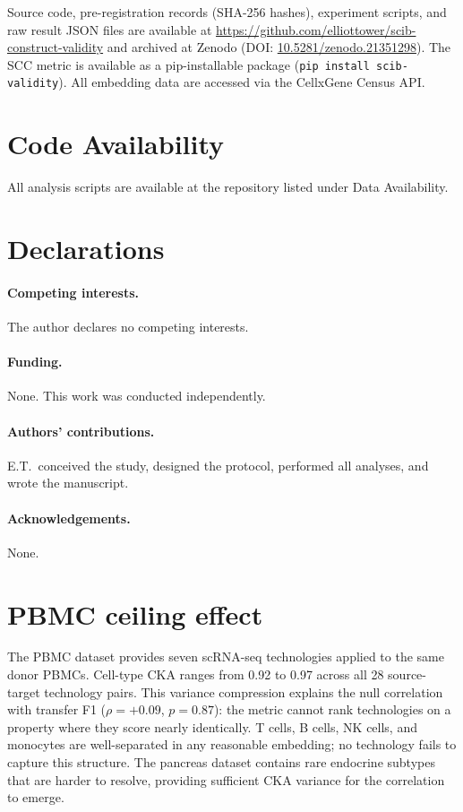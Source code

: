 \documentclass[11pt]{article}
\begin{document}
Source code, pre-registration records (SHA-256 hashes), experiment
scripts, and raw result JSON files are available at
\url{https://github.com/elliottower/scib-construct-validity} and
archived at Zenodo (DOI:
\href{https://doi.org/10.5281/zenodo.21351298}{10.5281/zenodo.21351298}).
The SCC metric is available as a pip-installable package (\texttt{pip
install scib-validity}). All embedding data are accessed via the
CellxGene Census API.

\section*{Code Availability}

All analysis scripts are available at the repository listed under Data
Availability.

\section*{Declarations}

\paragraph{Competing interests.} The author declares no competing
interests.

\paragraph{Funding.} None. This work was conducted independently.

\paragraph{Authors' contributions.} E.T.\ conceived the study,
designed the protocol, performed all analyses, and wrote the
manuscript.

\paragraph{Acknowledgements.} None.


\appendix

\section{PBMC ceiling effect}
\label{app:pbmc}

The PBMC dataset \citep{ding2020systematic} provides seven scRNA-seq
technologies applied to the same donor PBMCs. Cell-type CKA ranges from
0.92 to 0.97 across all 28 source-target technology pairs. This
variance compression explains the null correlation with transfer F1
($\rho = +0.09$, $p = 0.87$): the metric cannot rank technologies on
a property where they score nearly identically. T cells, B cells, NK
cells, and monocytes are well-separated in any reasonable embedding; no
technology fails to capture this structure. The pancreas dataset contains
rare endocrine subtypes that are harder to resolve, providing sufficient
CKA variance for the correlation to emerge.
\end{document}
